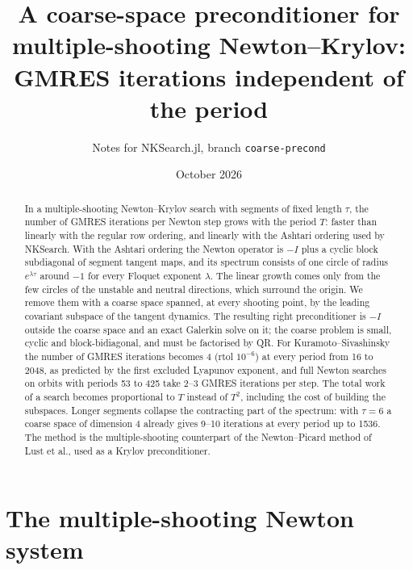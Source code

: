 \documentclass[11pt,a4paper]{article}
\title{A coarse-space preconditioner for multiple-shooting Newton--Krylov:\\
GMRES iterations independent of the period}
\author{Notes for NKSearch.jl, branch \texttt{coarse-precond}}
\date{October 2026}
\begin{document}
\maketitle

\begin{abstract}
In a multiple-shooting Newton--Krylov search with segments of fixed length $\tau$, the number of GMRES iterations per Newton step grows with the period $T$: faster than linearly with the regular row ordering, and linearly with the Ashtari ordering used by NKSearch. With the Ashtari ordering the Newton operator is $-I$ plus a cyclic block subdiagonal of segment tangent maps, and its spectrum consists of one circle of radius $e^{\lambda\tau}$ around $-1$ for every Floquet exponent $\lambda$. The linear growth comes only from the few circles of the unstable and neutral directions, which surround the origin. We remove them with a coarse space spanned, at every shooting point, by the leading covariant subspace of the tangent dynamics. The resulting right preconditioner is $-I$ outside the coarse space and an exact Galerkin solve on it; the coarse problem is small, cyclic and block-bidiagonal, and must be factorised by QR. For Kuramoto--Sivashinsky the number of GMRES iterations becomes 4 (rtol $10^{-6}$) at every period from 16 to 2048, as predicted by the first excluded Lyapunov exponent, and full Newton searches on orbits with periods 53 to 425 take 2--3 GMRES iterations per step. The total work of a search becomes proportional to $T$ instead of $T^2$, including the cost of building the subspaces. Longer segments collapse the contracting part of the spectrum: with $\tau = 6$ a coarse space of dimension 4 already gives 9--10 iterations at every period up to 1536. The method is the multiple-shooting counterpart of the Newton--Picard method of Lust et al., used as a Krylov preconditioner.
\end{abstract}

\tableofcontents

\section{The multiple-shooting Newton system}
\end{document}
